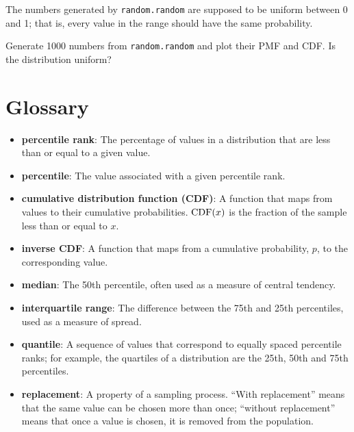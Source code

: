 \documentclass[12pt]{book}
\begin{document}
\begin{exercise}
The numbers generated by {\tt random.random} are supposed to be
uniform between 0 and 1; that is, every value in the range
should have the same probability.

Generate 1000 numbers from {\tt random.random} and plot their
PMF and CDF.  Is the distribution uniform?

\end{exercise}


\section{Glossary}

\begin{itemize}

\item {\bf percentile rank}: The percentage of values in a distribution that are
less than or equal to a given value.

\item {\bf percentile}: The value associated with a given percentile rank.

\item {\bf cumulative distribution function (CDF)}: A function that maps
  from values to their cumulative probabilities.  $\mathrm{CDF}(x)$ is the
  fraction of the sample less than or equal to $x$.  

\item {\bf inverse CDF}: A function that maps from a cumulative probability,
  $p$, to the corresponding value.

\item {\bf median}: The 50th percentile, often used as a measure of central
  tendency.  

\item {\bf interquartile range}: The difference between
the 75th and 25th percentiles, used as a measure of spread.

\item {\bf quantile}: A sequence of values that correspond to equally spaced
percentile ranks; for example, the quartiles of a distribution are
the 25th, 50th and 75th percentiles.

\item {\bf replacement}: A property of a sampling process. ``With replacement''
means that the same value can be chosen more than once; ``without
replacement'' means that once a value is chosen, it is removed from
the population.

\end{itemize}
\end{document}
